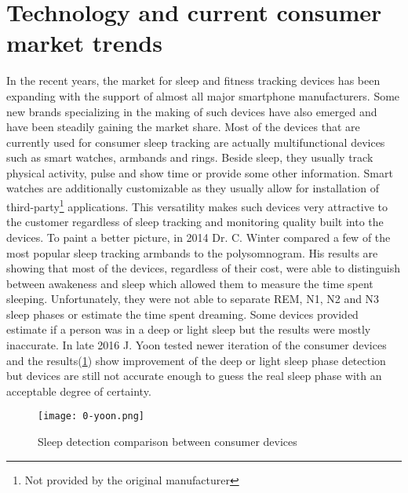 \section{Technology and current consumer market trends}

In the recent years, the market for sleep and fitness tracking devices has been expanding with the support of almost all major smartphone manufacturers. Some new brands specializing in the making of such devices have also emerged and have been steadily gaining the market share. Most of the devices that are currently used for consumer sleep tracking are actually multifunctional devices such as smart watches, armbands and rings. Beside sleep, they usually track physical activity, pulse and show time or provide some other information. Smart watches are additionally customizable as they usually allow for installation of third-party\footnote{Not provided by the original manufacturer} applications. This versatility makes such devices very attractive to the customer regardless of sleep tracking and monitoring quality built into the devices. To paint a better picture, in 2014 Dr. C. Winter compared a few of the most popular sleep tracking armbands to the polysomnogram\cite{Winter}. His results are showing that most of the devices, regardless of their cost, were able to distinguish between awakeness and sleep which allowed them to measure the time spent sleeping. Unfortunately, they were not able to separate REM, N1, N2 and N3 sleep phases or estimate the time spent dreaming. Some devices provided estimate if a person was in a deep or light sleep but the results were mostly inaccurate. In late 2016 J. Yoon tested newer iteration of the consumer devices and the results(\ref{fig:yoon}) show improvement of the deep or light sleep phase detection but devices are still not accurate enough to guess the real sleep phase with an acceptable degree of certainty\cite{Yoon}.


\begin{figure}[h]
  \begin{center}
    \texttt{[image: 0-yoon.png]}
  \end{center}
  \caption{Sleep detection comparison between consumer devices}
  \label{fig:yoon}
\end{figure}

